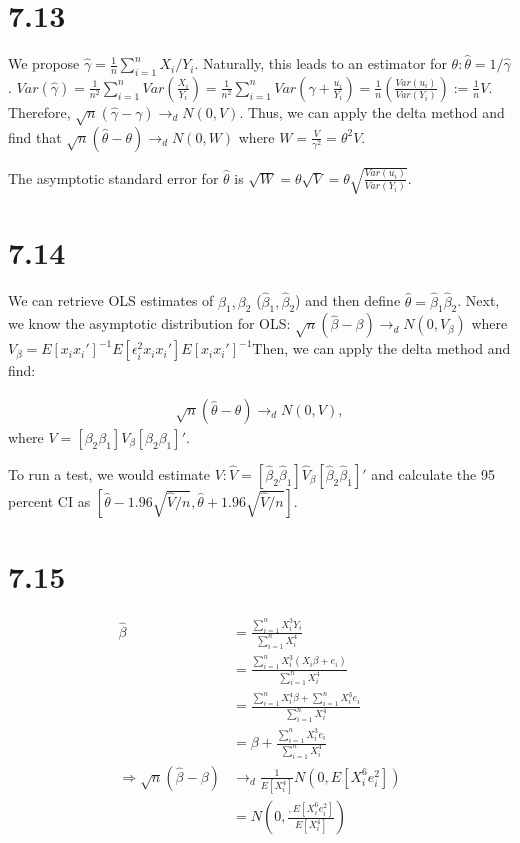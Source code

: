 \documentclass[11pt]{article} %
\begin{document}
\section{7.13}
We propose $\hat{\gamma} = \frac{1}{n}\sum_{i=1}^n X_i/Y_i$. Naturally, this leads to an estimator for $\theta: \hat{\theta} = 1/\hat{\gamma}$. $Var(\hat{\gamma}) = \frac{1}{n^2} \sum_{i=1}^{n}Var\left( \frac{X_i}{Y_i} \right) = \frac{1}{n^2} \sum_{i=1}^{n}Var\left( \gamma + \frac{u_i}{Y_i} \right) = \frac{1}{n} \left( \frac{Var(u_i)}{Var(Y_i)} \right):= \frac{1}{n}V$. Therefore, $\sqrt{n}(\hat{\gamma} - \gamma) \rightarrow_d N(0,V).$ Thus, we can apply the delta method and find that $\sqrt{n}(\hat{\theta} - \theta) \rightarrow_d N(0,W)$ where $W = \frac{V}{\gamma^2} = \theta^2V$.

The asymptotic standard error for $\hat{\theta}$ is $\sqrt{W} = \theta \sqrt{V} = \theta \sqrt{\frac{Var(u_i)}{Var(Y_i)}}.$

\section{7.14}
We can retrieve OLS estimates of $\beta_1,\beta_2$ ($\hat{\beta}_1,\hat{\beta}_2$) and then define $\hat{\theta} = \hat{\beta}_1 \hat{\beta}_2$. Next, we know the asymptotic distribution for OLS: $\sqrt{n}(\hat{\beta} - \beta) \rightarrow_d N(0,V_\beta)$ where $V_{\beta} = E[x_ix_i']^{-1} E[\epsilon_i^2x_ix_i']  E[x_ix_i']^{-1} $Then, we can apply the delta method and find:

\begin{align*}
\sqrt{n}(\hat{\theta} - \theta) \rightarrow_d N(0,V),
\end{align*}
where $V = [\beta_2 \beta_1]V_{\beta} [\beta_2 \beta_1 ]'$. %

To run a test, we would estimate $V: \hat{V} = [\hat{\beta}_2 \hat{\beta}_1]\hat{V}_{\beta}[\hat{\beta}_2 \hat{\beta}_1]'$ and calculate the 95 percent CI as $\left[\hat{\theta} - 1.96\sqrt{\hat{V}/n},\hat{\theta} + 1.96\sqrt{\hat{V}/n}\right]$.

\section{7.15}

\begin{align*}
\hat{\beta} &= \frac{\sum_{i=1}^n X_i^3 Y_i}{\sum_{i=1}^nX_i^4} \\
&= \frac{\sum_{i=1}^n X_i^3 (X_i \beta + e_i)}{\sum_{i=1}^nX_i^4} \\
&=  \frac{\sum_{i=1}^n X_i^4\beta + \sum_{i=1}^nX_i^3e_i}{\sum_{i=1}^nX_i^4}\\
&= \beta + \frac{ \sum_{i=1}^nX_i^3e_i}{\sum_{i=1}^nX_i^4}\\
\Rightarrow \sqrt{n}(\hat{\beta} - \beta) &\rightarrow_d \frac{1}{E[X_i^4]}N(0,E[X_i^6e_i^2])\\
&=  N\left(0,\frac{,E[X_i^6e_i^2]}{E[X_i^4]} \right)
\end{align*}
\end{document}
